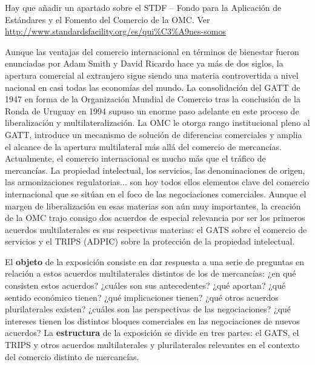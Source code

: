 \documentclass{nuevotema}
\begin{document}
\ideaclave

Hay que añadir un apartado sobre el STDF -- Fondo para la Aplicación de Estándares y el Fomento del Comercio de la OMC. Ver \url{http://www.standardsfacility.org/es/qui\%C3\%A9nes-somos}

Aunque las ventajas del comercio internacional en términos de bienestar fueron enunciadas por Adam Smith y David Ricardo hace ya más de dos siglos, la apertura comercial al extranjero sigue siendo una materia controvertida a nivel nacional en casi todas las economías del mundo. La consolidación del GATT de 1947 en forma de la Organización Mundial de Comercio tras la conclusión de la Ronda de Uruguay en 1994 supuso un enorme paso adelante en este proceso de liberalización y multilateralización. La OMC le otorga rango institucional pleno al GATT, introduce un mecanismo de solución de diferencias comerciales y amplia el alcance de la apertura multilateral más allá del comercio de mercancías. Actualmente, el comercio internacional es mucho más que el tráfico de mercancías. La propiedad intelectual, los servicios, las denominaciones de origen, las armonizaciones regulatorias... son hoy todos ellos elementos clave del comercio internacional que se sitúan en el foco de las negociaciones comerciales. Aunque el margen de liberalización en esas materias son aún muy importantes, la creación de la OMC trajo consigo dos acuerdos de especial relevancia por ser los primeros acuerdos multilaterales es sus respectivas materias: el GATS sobre el comercio de servicios y el TRIPS (ADPIC) sobre la protección de la propiedad intelectual.

El \textbf{objeto} de la exposición consiste en dar respuesta a una serie de preguntas en relación a estos acuerdos multilaterales distintos de los de mercancías: ¿en qué consisten estos acuerdos? ¿cuáles son sus antecedentes? ¿qué aportan? ¿qué sentido económico tienen? ¿qué implicaciones tienen? ¿qué otros acuerdos plurilaterales existen? ¿cuáles son las perspectivas de las negociaciones? ¿qué intereses tienen los distintos bloques comerciales en las negociaciones de nuevos acuerdos? La \textbf{estructura} de la exposición se divide en tres partes: el GATS, el TRIPS y otros acuerdos multilaterales y plurilaterales relevantes en el contexto del comercio distinto de mercancías.
\end{document}
